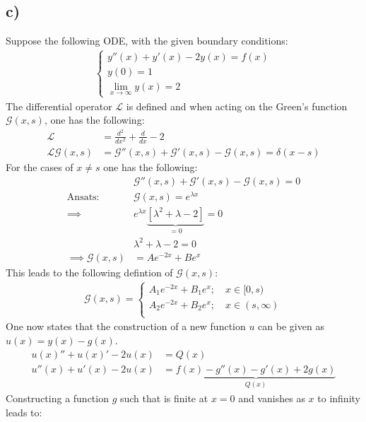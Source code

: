\documentclass{article}
\newcommand{\G}{\mathcal{G}}
\begin{document}
\subsection*{c)}
Suppose the following ODE, with the given boundary conditions:
\begin{align}
    \begin{cases}
        y''(x) + y'(x) - 2y(x) = f(x)\\
        y (0) = 1\\
        \lim_{x\to\infty}y(x) = 2
    \end{cases}\label{eq: task 2c ode}  
\end{align}
The differential operator $\mathcal{L}$ is defined and when acting on the Green's function $\mathcal{G}(x,s)$, one has the following:
\begin{align*}
    \mathcal{L} &= \frac{d^2}{dx^2} + \frac{d}{dx} - 2\\
    \mathcal{L}\mathcal{G}(x,s) &= \mathcal{G}''(x,s) + \mathcal{G}'(x,s) - \mathcal{G}(x,s) = \delta(x-s)
\end{align*}
For the cases of $x \neq s$ one has the following:
\begin{align*}
    &\G''(x,s) + \G'(x,s) - \G(x,s) = 0\\
    \text{Ansats: }&\G(x,s) = e^{\lambda x}\\
    \implies &e^{\lambda x}\underbrace{\left[\lambda^2 + \lambda -2\right]}_{=0} = 0\\
    &\lambda^2 + \lambda -2 = 0\\
    \implies \G(x,s)& = Ae^{-2x} + Be^{x}
\end{align*}This leads to the following defintion of $\G(x,s)$:
\begin{align*}
    \G(x,s) = \begin{cases}
        A_1e^{-2x} + B_1e^{x}; \quad x \in [0,s)\\
        A_2e^{-2x} + B_2e^{x}; \quad x \in (s,\infty)\\
    \end{cases}
\end{align*}One now states that the construction of a new function $u$ can be given as $u(x) = y(x) - g(x)$.
\begin{align*}
    u(x)'' + u(x)' -2u(x) &=Q(x)\\
    u''(x) + u'(x) - 2u(x) &= \underbrace{f(x) - g''(x) - g'(x) + 2g(x)}_{Q(x)}
\end{align*}Constructing a function $g$ such that is finite at $x = 0$ and vanishes as $x$ to infinity leads to:
\end{document}
